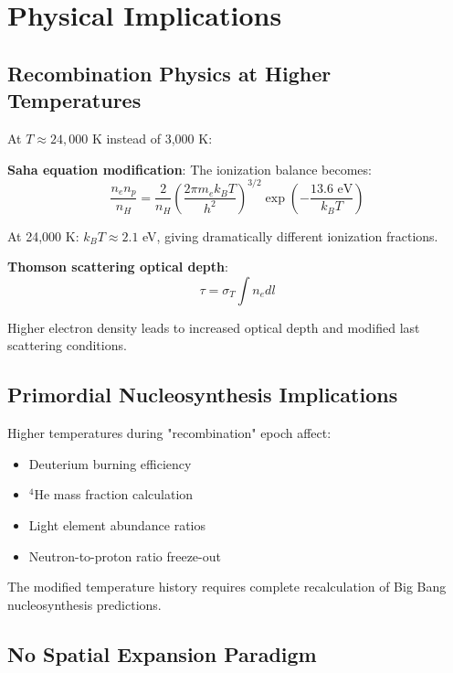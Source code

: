 \documentclass[12pt,a4paper]{article}
\begin{document}
	\section{Physical Implications}
	\label{sec:physical_implications}
	
	\subsection{Recombination Physics at Higher Temperatures}
	\label{subsec:recombination_physics}
	
	At $T \approx 24{,}000$ K instead of 3,000 K:
	
	\textbf{Saha equation modification}: The ionization balance becomes:
	\begin{equation}
		\frac{n_e n_p}{n_H} = \frac{2}{n_H}\left(\frac{2\pi m_e k_B T}{h^2}\right)^{3/2} \exp\left(-\frac{13.6 \text{ eV}}{k_B T}\right)
	\end{equation}
	
	At 24,000 K: $k_B T \approx 2.1$ eV, giving dramatically different ionization fractions.
	
	\textbf{Thomson scattering optical depth}:
	\begin{equation}
		\tau = \sigma_T \int n_e dl
	\end{equation}
	
	Higher electron density leads to increased optical depth and modified last scattering conditions.
	
	\subsection{Primordial Nucleosynthesis Implications}
	\label{subsec:nucleosynthesis}
	
	Higher temperatures during "recombination" epoch affect:
	\begin{itemize}
		\item Deuterium burning efficiency
		\item $^4$He mass fraction calculation
		\item Light element abundance ratios
		\item Neutron-to-proton ratio freeze-out
	\end{itemize}
	
	The modified temperature history requires complete recalculation of Big Bang nucleosynthesis predictions.
	
	\subsection{No Spatial Expansion Paradigm}
	\label{subsec:no_expansion}
	
\end{document}
